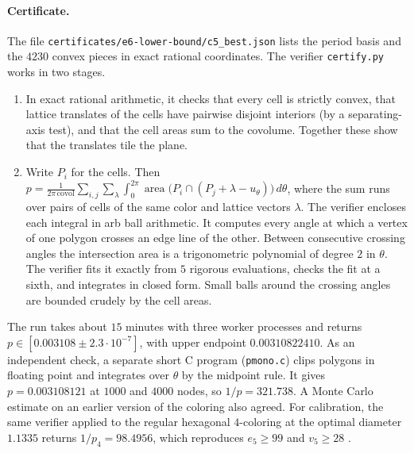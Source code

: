 \documentclass[11pt]{article}
\theoremstyle{definition}
\theoremstyle{remark}
\begin{document}
\paragraph{Certificate.}
The file \texttt{certificates/e6-lower-bound/c5\_best.json} lists the
period basis and the $4230$ convex pieces in exact rational coordinates.  The
verifier \texttt{certify.py} works in two stages.
\begin{enumerate}[label=(\roman*)]
\item In exact rational arithmetic, it checks that every cell is strictly
convex, that lattice translates of the cells have pairwise disjoint
interiors (by a separating-axis test), and that the cell areas sum to
the covolume.  Together these show that the translates tile the plane.
\item Write $P_i$ for the cells.  Then
$p=\frac{1}{2\pi\,\mathrm{covol}}\sum_{i,j}\sum_{\lambda}
\int_0^{2\pi}\operatorname{area}\bigl(P_i\cap(P_j+\lambda-u_\theta)\bigr)\,d\theta$,
where the sum runs over pairs of cells of the same color and lattice
vectors $\lambda$.  The verifier encloses each integral in arb ball
arithmetic.  It computes every angle at which a vertex of one polygon
crosses an edge line of the other.  Between consecutive crossing angles
the intersection area is a trigonometric polynomial of degree $2$ in
$\theta$.  The verifier fits it exactly from $5$ rigorous evaluations,
checks the fit at a sixth, and integrates in closed form.  Small balls
around the crossing angles are bounded crudely by the cell areas.
\end{enumerate}
The run takes about $15$ minutes with three worker processes and returns
$p\in[0.003108\pm2.3\cdot10^{-7}]$, with upper endpoint $0.00310822410$.  As an independent check, a separate
short C program (\texttt{pmono.c}) clips polygons in floating point and
integrates over $\theta$ by the midpoint rule.  It gives
$p=0.003108121$ at $1000$ and $4000$ nodes, so
$1/p=321.738$.  A Monte Carlo estimate on an earlier version of the
coloring also agreed.  For calibration, the same verifier applied to the
regular hexagonal $4$-coloring at the optimal diameter $1.1335$ returns
$1/p_4=98.4956$, which reproduces $e_5\ge99$ and $v_5\ge28$
\cite{deGreyParts22}.
\end{document}
